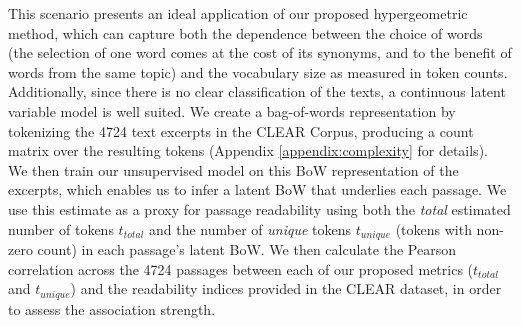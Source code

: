 \documentclass{article}
\theoremstyle{plain}
\theoremstyle{definition}
\theoremstyle{remark}
\begin{document}
This scenario presents an ideal application of our proposed hypergeometric method, which can capture both the dependence between the choice of words (the selection of one word comes at the cost of its synonyms, and to the benefit of words from the same topic) and the vocabulary size as measured in token counts. Additionally, since there is no clear classification of the texts, a continuous latent variable model is well suited. We create a bag-of-words representation by tokenizing the 4724 text excerpts in the CLEAR Corpus, producing a count matrix over the resulting tokens (Appendix \ref{appendix:complexity} for details). We then train our unsupervised model on this BoW representation of the excerpts, which enables us to infer a latent BoW that underlies each passage. We use this estimate as a proxy for passage readability using both the \textit{total} estimated number of tokens $t_{total}$ and the number of \textit{unique} tokens $t_{unique}$ (tokens with non-zero count) in each passage's latent BoW. We then calculate the Pearson correlation across the 4724 passages between each of our proposed metrics ($t_{total}$ and $t_{unique}$) and the readability indices provided in the CLEAR dataset, in order to assess the association strength.
\end{document}

